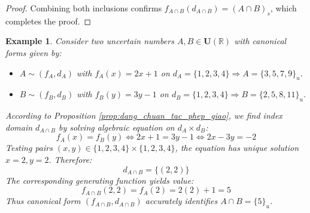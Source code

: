 \documentclass[a4paper,12pt,twoside]{memoir}
\newtheorem{example}{Example}[chapter]
\begin{document}
\begin{proof}
		Combining both inclusions confirms $f_{A \cap B}(d_{A \cap B}) = (A \cap B)_s$, which completes the proof.
	\end{proof}
	\begin{example}
		Consider two uncertain numbers $A, B \in \mathbf{U}(\mathbb{R})$ with canonical forms given by:
		\begin{itemize}[leftmargin=*]
			\item $A \sim (f_A, d_A)$ with $f_A(x) = 2x + 1$ on $d_A = \{1, 2, 3, 4\} \Rightarrow A = \{3, 5, 7, 9\}_u$.
			\item $B \sim (f_B, d_B)$ with $f_B(y) = 3y - 1$ on $d_B = \{1, 2, 3, 4\} \Rightarrow B = \{2, 5, 8, 11\}_u$.
		\end{itemize}
		
		According to Proposition \ref{prop:dang_chuan_tac_phep_giao}, we find index domain $d_{A \cap B}$ by solving algebraic equation on $d_A \times d_B$:
		\[
		f_A(x) = f_B(y) \iff 2x + 1 = 3y - 1 \iff 2x - 3y = -2
		\]
		Testing pairs $(x, y) \in \{1, 2, 3, 4\} \times \{1, 2, 3, 4\}$, the equation has unique solution $x = 2, y = 2$. Therefore:
		\[
		d_{A \cap B} = \{(2, 2)\}
		\]
		The corresponding generating function yields value:
		\[
		f_{A \cap B}(2, 2) = f_A(2) = 2(2) + 1 = 5
		\]
		Thus canonical form $(f_{A \cap B}, d_{A \cap B})$ accurately identifies $A \cap B = \{5\}_u$.
	\end{example}
	
\end{document}
